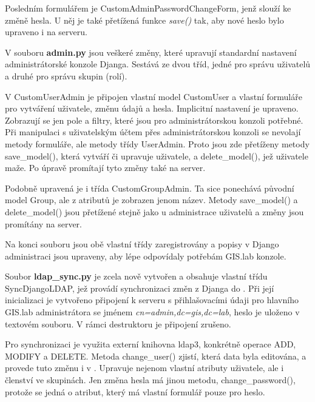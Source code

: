 Posledním formulářem je \textsf{CustomAdminPasswordChangeForm}, jenž
slouží ke změně hesla. U něj je také přetížená funkce \textit{save()}
tak, aby nové heslo bylo upraveno i na serveru.

V souboru \textbf{admin.py} jsou veškeré změny, které upravují
standardní nastavení administrátorské konzole Djanga. Sestává ze dvou
tříd, jedné pro správu uživatelů a druhé pro správu skupin (rolí).

V \textsf{CustomUserAdmin} je připojen vlastní model
\textsf{CustomUser} a vlastní formuláře pro vytváření uživatele, změnu
údajů a hesla. Implicitní nastavení je upraveno. Zobrazují se jen
pole a filtry, které jsou pro administrátorskou konzoli potřebné. Při
manipulaci s uživatelským účtem přes administrátorskou konzoli se
nevolají metody formuláře, ale metody třídy \textsf{UserAdmin}. Proto
jsou zde přetíženy metody \textsf{save\_model()}, která vytváří či
upravuje uživatele, a \textsf{delete\_model()}, jež uživatele maže. Po
úpravě promítají tyto změny také na  server.

Podobně upravená je i třída \textsf{CustomGroupAdmin}. Ta sice
ponechává původní model \textsf{Group}, ale z atributů je zobrazen
jenom název. Metody \textsf{save\_model()} a \textsf{delete\_model()}
jsou přetížené stejně jako u administrace uživatelů a změny jsou
promítány na  server.

Na konci souboru jsou obě vlastní třídy zaregistrovány a popisy v
Django administraci jsou upraveny, aby lépe odpovídaly potřebám
GIS.lab konzole.

Soubor \textbf{ldap\_sync.py} je zcela nově vytvořen a obsahuje
vlastní třídu \textsf{SyncDjangoLDAP}, jež provádí synchronizaci změn
z Djanga do . Při její inicializaci je vytvořeno připojení k
 serveru s přihlašovacími údaji pro hlavního GIS.lab
administrátora se jménem \textit{cn=admin,dc=gis,dc=lab}, heslo je
uloženo v textovém souboru. V rámci destruktoru je připojení zrušeno.

Pro synchronizaci je využita externí knihovna ldap3, konkrétně operace
\textsf{ADD}, \textsf{MODIFY} a \textsf{DELETE}. Metoda
\textsf{change\_user()} zjistí, která data byla editována, a provede
tuto změnu i v . Upravuje nejenom vlastní atributy uživatele,
ale i členství ve skupinách. Jen změna hesla má jinou metodu,
\textsf{change\_password()}, protože se jedná o atribut, který má
vlastní formulář pouze pro heslo.

